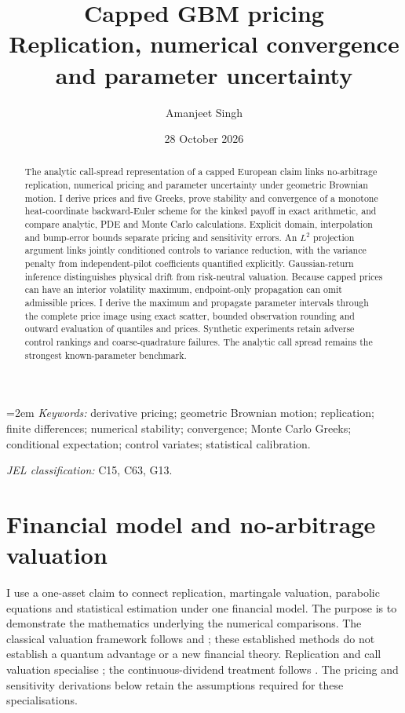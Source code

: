 \documentclass[11pt]{article}
\title{Capped GBM pricing\\[2mm]\large Replication, numerical convergence and parameter uncertainty}
\author{Amanjeet Singh}
\date{28 October 2026}
\begin{document}
\maketitle
\begin{abstract}
\noindent
The analytic call-spread representation of a capped European claim links
no-arbitrage replication, numerical pricing and parameter uncertainty under
geometric Brownian motion. I derive prices and five Greeks, prove stability
and convergence of a monotone heat-coordinate backward-Euler scheme for the
kinked payoff in exact arithmetic, and compare analytic, PDE and Monte Carlo
calculations. Explicit domain, interpolation and bump-error bounds separate
pricing and sensitivity errors. An $L^2$ projection argument links jointly conditioned controls to variance
reduction, with the variance penalty from independent-pilot coefficients quantified explicitly. Gaussian-return inference distinguishes physical drift
from risk-neutral valuation. Because capped prices can have an interior
volatility maximum, endpoint-only propagation can omit admissible prices.
I derive the maximum and propagate parameter intervals through the complete
price image using exact scatter, bounded observation rounding and outward
evaluation of quantiles and prices. Synthetic experiments retain adverse control
rankings and coarse-quadrature failures. The analytic call spread remains
the strongest known-parameter benchmark.
\end{abstract}
\noindent\begin{minipage}{\linewidth}
\small\emergencystretch=2em
\textit{Keywords:} derivative pricing; geometric Brownian motion; replication;
finite differences; numerical stability; convergence; Monte Carlo Greeks;
conditional expectation; control variates; statistical calibration.\par
\smallskip\textit{JEL classification:} C15, C63, G13.\par
\end{minipage}

\section{Financial model and no-arbitrage valuation}
\label{sec:cgbm-model}

I use a one-asset claim to connect replication, martingale valuation,
parabolic equations and statistical estimation under one financial model.
The purpose is to demonstrate the mathematics underlying the numerical
comparisons. The classical valuation framework follows
\citet{blackscholes1973} and \citet{merton1973}; these established methods
do not establish a quantum advantage or a new financial theory. Replication and call valuation specialise
\citet{blackscholes1973}; the continuous-dividend treatment follows
\citet{merton1973}. The pricing and sensitivity derivations below retain
the assumptions required for these specialisations.
\end{document}
